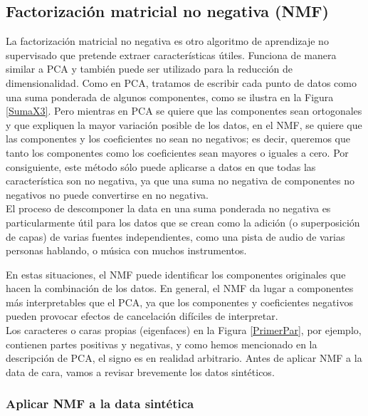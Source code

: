 \subsection{Factorización matricial no negativa (NMF)} 


La factorización matricial no negativa es otro algoritmo de aprendizaje no supervisado que pretende
 extraer características útiles. Funciona de manera similar a PCA y también puede ser utilizado para la reducción de dimensionalidad. Como en PCA,  tratamos de escribir cada punto de datos como una suma ponderada de algunos componentes, como se ilustra en la Figura \ref{SumaX3}.   Pero mientras en PCA se quiere que las componentes sean ortogonales y que expliquen la mayor variación posible de los datos, en el NMF, se quiere que las componentes y los coeficientes no sean no negativos; es decir, queremos que tanto los componentes como los coeficientes sean mayores o iguales a cero. Por consiguiente, este método sólo puede aplicarse a datos en  que todas las característica son  no  negativa, ya que una suma no negativa de componentes no negativos no puede convertirse en no negativa. \\



El proceso de descomponer la data  en una suma ponderada no negativa es particularmente útil para los 
datos que se crean como la adición (o superposición de capas) de varias fuentes independientes, como una pista de audio de varias personas hablando, o música con muchos instrumentos. 

En estas situaciones, el NMF puede identificar los componentes originales que hacen la combinación de los datos. En general, el NMF da lugar a componentes más interpretables que el PCA, ya que los componentes y coeficientes negativos pueden provocar efectos de cancelación difíciles de interpretar.\\

Los caracteres o caras  propias  (eigenfaces) en la Figura \ref{PrimerPar}, por ejemplo, contienen partes positivas y negativas, y como hemos mencionado en la descripción de PCA, el signo es en realidad arbitrario. Antes de aplicar NMF a la data de cara, vamos a revisar brevemente los datos sintéticos.


\subsubsection{Aplicar NMF a la data sintética}


